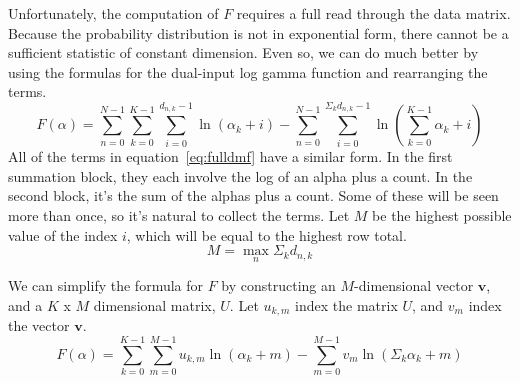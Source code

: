 \documentclass[twoside]{article}
\begin{document}
Unfortunately, the computation of $F$ requires a full read through the data matrix.  Because the probability distribution is not in exponential form, there cannot be a sufficient statistic of constant dimension.\cite[pg 116]{robert}  Even so, we can do much better by using the formulas for the dual-input log gamma function and rearranging the terms.
\begin{equation} \label{eq:fulldmf}
F(\alpha)= \sum_{n=0}^{N-1}\sum_{k=0}^{K-1}\sum_{i=0}^{d_{n,k}-1}\ln\left(\alpha_k+i\right)-
\sum_{n=0}^{N-1}\sum_{i=0}^{\Sigma_kd_{n,k}-1}\ln\left(\sum_{k=0}^{K-1}\alpha_k+i\right)
\end{equation}
All of the terms in equation~\eqref{eq:fulldmf} have a similar form.  In the first summation block, they each involve the log of an alpha plus a count.  In the second block, it’s the sum of the alphas plus a count.  Some of these will be seen more than once, so it’s natural to collect the terms.  Let $M$ be the highest possible value of the index $i$, which will be equal to the highest row total.
\[M = \max_n\Sigma_kd_{n,k}\]

We can simplify the formula for $F$ by constructing an $M$-dimensional vector $\mathbf{v}$, and a $K$ x $M$ dimensional matrix, $U$.  Let $u_{k,m}$ index the matrix $U$, and $v_m$ index the vector $\mathbf{v}$.
\begin{equation} \label{eq:finaldmf}
F(\alpha)=\sum_{k=0}^{K-1}\sum_{m=0}^{M-1}u_{k,m}\ln(\alpha_k+m)-
\sum_{m=0}^{M-1}v_m\ln(\Sigma_k\alpha_k+m)
\end{equation}
\end{document}
